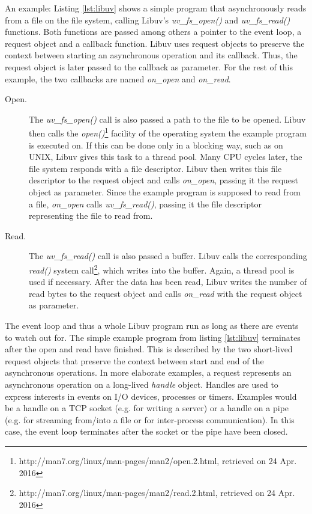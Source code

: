 An example: Listing \ref{lst:libuv} shows a simple program that asynchronously reads from a file on the file system, calling Libuv's \textit{uv\_fs\_open()} and \textit{uv\_fs\_read()} functions. Both functions are passed among others a pointer to the event loop, a request object and a callback function. Libuv uses request objects to preserve the context between starting an asynchronous operation and its callback. Thus, the request object is later passed to the callback as parameter. For the rest of this example, the two callbacks are named \textit{on\_open} and \textit{on\_read}. 
\begin{description}
\item[Open.] The \textit{uv\_fs\_open()} call is also passed a path to the file to be opened. Libuv then calls the \textit{open()}\footnote{http://man7.org/linux/man-pages/man2/open.2.html, retrieved on 24 Apr. 2016} facility of the operating system the example program is executed on. If this can be done only in a blocking way, such as on UNIX, Libuv gives this task to a thread pool. Many CPU cycles later, the file system responds with a file descriptor. Libuv then writes this file descriptor to the request object and calls \textit{on\_open}, passing it the request object as parameter. Since the example program is supposed to read from a file, \textit{on\_open } calls \textit{uv\_fs\_read()}, passing it the file descriptor representing the file to read from.
\item[Read.] The \textit{uv\_fs\_read()} call is also passed a buffer. Libuv calls the corresponding \textit{read()} system call\footnote{http://man7.org/linux/man-pages/man2/read.2.html, retrieved on 24 Apr. 2016}, which writes into the buffer. Again, a thread pool is used if necessary. After the data has been read, Libuv writes the number of read bytes to the request object and calls \textit{on\_read} with the request object as parameter.
\end{description}

The event loop and thus a whole Libuv program run as long as there are events to watch out for. The simple example program from listing \ref{lst:libuv} terminates after the open and read have finished. This is described by the two short-lived request objects that preserve the context between start and end of the asynchronous operations. In more elaborate examples, a request represents an asynchronous operation on a long-lived \textit{handle} object. Handles are used to express interests in events on I/O devices, processes or timers. Examples would be a handle on a TCP socket (e.g. for writing a server) or a handle on a pipe (e.g. for streaming from/into a file or for inter-process communication). In this case, the event loop terminates after the socket or the pipe have been closed. 

